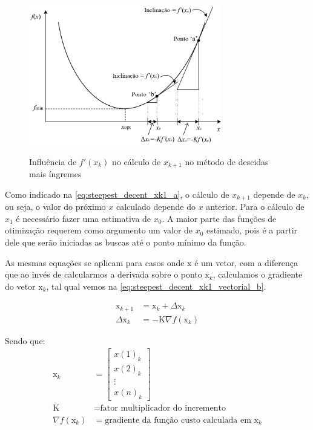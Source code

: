 \begin{figure}
	\caption{Influência de $f'(x_k)$ no cálculo de $x_{k+1}$ no método de descidas mais íngremes}
	\begin{center}
		\includegraphics[width=0.75\textwidth]{./5_images/fig_steepest_decent_slope.png} 
		\label{fig:steepest_decent_slope}
	\end{center}
	\centering
\end{figure}

Como indicado na \cref{eq:steepest_decent_xk1_a}, o cálculo de $x_{k+1}$ depende
de $x_k$, ou seja, o valor do próximo $x$ calculado depende do $x$ anterior. Para
o cálculo de $x_1$ é necessário fazer uma estimativa de $x_0$. A maior parte das
funções de otimização requerem como argumento um valor de $x_0$ estimado, pois é
a partir dele que serão iniciadas as buscas até o ponto mínimo da função.

As mesmas equações se aplicam para casos onde $\mathrm{x}$ é um vetor, com a diferença que
ao invés de calcularmos a derivada sobre o ponto $\mathrm{x}_k$, calculamos o gradiente
do vetor $\mathrm{x}_k$, tal qual vemos na \cref{eq:steepest_decent_xk1_vectorial_b}.

\begin{subequations}
	\begin{align}
		\mathrm{x}_{k+1} &= \mathrm{x}_k + \Delta \mathrm{x}_k			\label{eq:steepest_decent_xk1_vectorial_a} \\ 
		\Delta \mathrm{x}_k &= \mathrm{-K} \nabla f(\mathrm{x}_k)		\label{eq:steepest_decent_xk1_vectorial_b}
	\end{align}
\end{subequations}

\noindent
Sendo que: \\
\begin{align*}
	\mathrm{x}_k &= 					
	\begin{bmatrix}
		x(1)_{k} \\
		x(2)_{k} \\
		\vdots \\
		x(n)_{k}
	\end{bmatrix} \\
	\mathrm{K} &= \text{fator multiplicador do incremento} \\
	\nabla f(\mathrm{x}_k) &= \text{gradiente da função custo calculada em } \mathrm{x}_k
\end{align*}
\newline

